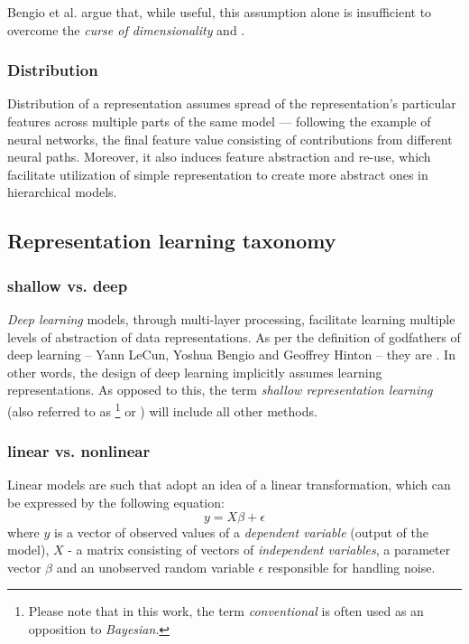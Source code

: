 \vspace{\baselineskip}
Bengio et al. \cite{Bengio2012} argue that, while useful, this assumption alone is insufficient to overcome the \textit{curse of dimensionality} and .


\subsubsection{Distribution}
Distribution of a representation assumes spread of the representation's particular features across multiple parts of the same model — following the example of neural networks, the final feature value consisting of contributions from different neural paths. Moreover, it also induces feature abstraction and re-use, which facilitate utilization of simple representation to create more abstract ones in hierarchical models.


\subsection{Representation learning taxonomy}

\subsubsection{shallow vs. deep}\label{subsubsec:conventional-deep}
\textit{Deep learning} models, through multi-layer processing, facilitate learning multiple levels of abstraction of data representations. As per the definition of godfathers of deep learning – Yann LeCun, Yoshua Bengio and Geoffrey Hinton – they are  \cite{LeCun2015}. In other words, the design of deep learning implicitly assumes learning representations. As opposed to this, the term \textit{shallow representation learning} (also referred to as \footnote{Please note that in this work, the term \textit{conventional} is often used as an opposition to \textit{Bayesian}.} or ) will include all other methods.

\subsubsection{linear vs. nonlinear}
Linear models are such that adopt an idea of a linear transformation, which can be expressed by the following equation:
\begin{equation}
\label{eq:linear-model}
    y = X\beta + \epsilon
\end{equation}
where $y$ is a vector of observed values of a \textit{dependent variable} (output of the model), $X$ - a matrix consisting of vectors of \textit{independent variables}, a parameter vector $\beta$ and an unobserved random variable $\epsilon$ responsible for handling noise.

